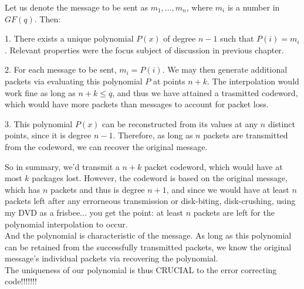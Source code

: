 Let us denote the message to be sent as $m_1, \dots, m_n$, where $m_i$ is a number in $GF(q)$. Then:
\begin{bindenum}
    \item[1.] There exists a unique polynomial $P(x)$ of degree $n - 1$ such that $P(i) = m_i$. Relevant properties were the focus subject of discussion in previous chapter.
    \item[2.] For each message to be sent, $m_i = P(i)$. We may then generate additional packets via evaluating this polynomial $P$ at points $n + k$. The interpolation would work fine as long as $n + k \leq q$, and thus we have attained a trasmitted codeword, which would have more packets than messages to account for packet loss.
    \item[3.] This polynomial $P(x)$ can be reconstructed from its values at any $n$ distinct points, since it is degree $n - 1$. Therefore, as long as $n$ packets are transmitted from the codeword, we can recover the original message. 
\end{bindenum}
So in summary, we'd transmit a $n + k$ packet codeword, which would have at most $k$ packages lost. However, the codeword is based on the original message, which has $n$ packets and thus is degree $n + 1$, and since we would have at least $n$ packets left after any errorneous transmission or disk-biting, disk-crushing, using my DVD as a frisbee... you get the point: at least $n$ packets are left for the polynomial interpolation to occur. \\
And the polynomial is characteristic of the message. As long as this polynomial can be retained from the successfully transmitted packets, we know the original message's individual packets via recovering the polynomial. \\
The uniqueness of our polynomial is thus CRUCIAL to the error correcting code!!!!!!!
